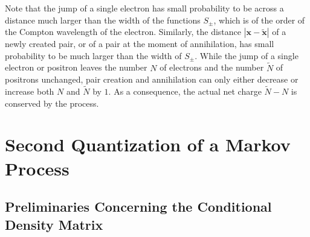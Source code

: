 \documentclass[12pt]{article}
\newcommand{\1}{\mathbf{1}} %
\newcommand{\vx}{{\boldsymbol x}} %
\newcommand{\pvx}{{\widetilde{\vx}}}
\newcommand{\pN}{{\widetilde{N}}}
\begin{document}
Note that the jump of a single electron has small probability to be
across a distance much larger than the width of the functions $S_\pm$,
which is of the order of the Compton wavelength of the
electron. Similarly, the distance $|\vx-\pvx|$ of a newly created
pair, or of a pair at  the moment of annihilation, has small probability
to be much larger than the width of $S_\pm$.  While the jump of a
single electron or positron leaves the number $N$ of electrons and the
number $\pN$ of positrons unchanged, pair creation and annihilation
can only either decrease or increase both $N$ and $\pN$ by $1$.  As a
consequence, the actual net charge $\pN-N$ is conserved by the
process.






\section{Second Quantization of a Markov Process}\label{sec:morefree}

\subsection{Preliminaries Concerning the Conditional Density Matrix}
\end{document}
